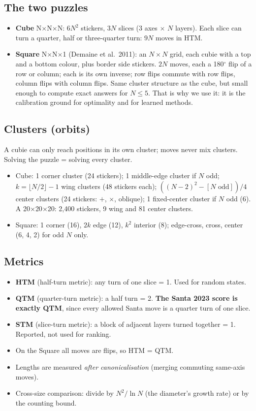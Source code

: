 \documentclass[10.5pt,a4paper]{article}
\newcommand{\Cu}[1]{#1$\times$#1$\times$#1}
\newcommand{\Sq}[1]{#1$\times$#1$\times$1}
\begin{document}
\subsection{The two puzzles}
\begin{itemize}
\item \textbf{Cube} \Cu{N}: $6N^2$ stickers, $3N$ slices (3 axes $\times$ $N$ layers). Each slice can turn a quarter, half or
three-quarter turn: $9N$ moves in HTM.
\item \textbf{Square} \Sq{N} (Demaine et al.\ 2011): an $N\times N$ grid, each cubie with a top and a bottom colour, plus
border side stickers. $2N$ moves, each a 180$^\circ$ flip of a row or column; each is its own inverse; row flips commute with
row flips, column flips with column flips. Same cluster structure as the cube, but small enough to compute exact answers for
$N\le5$. That is why we use it: it is the calibration ground for optimality and for learned methods.
\end{itemize}

\subsection{Clusters (orbits)}
A cubie can only reach positions in its own cluster; moves never mix clusters. Solving the puzzle = solving every cluster.
\begin{itemize}
\item Cube: 1 corner cluster (24 stickers); 1 middle-edge cluster if $N$ odd; $k=\lfloor N/2\rfloor-1$ wing clusters (48
stickers each); $((N-2)^2-[N\text{ odd}])/4$ center clusters (24 stickers: $+$, $\times$, oblique); 1 fixed-center cluster if
$N$ odd (6). A \Cu{20}: 2,400 stickers, 9 wing and 81 center clusters.
\item Square: 1 corner (16), $2k$ edge (12), $k^2$ interior (8); edge-cross, cross, center (6, 4, 2) for odd $N$ only.
\end{itemize}

\subsection{Metrics}
\begin{itemize}
\item \textbf{HTM} (half-turn metric): any turn of one slice = 1. Used for random states.
\item \textbf{QTM} (quarter-turn metric): a half turn = 2. \textbf{The Santa 2023 score is exactly QTM}, since every allowed
Santa move is a quarter turn of one slice.
\item \textbf{STM} (slice-turn metric): a block of adjacent layers turned together = 1. Reported, not used for ranking.
\item On the Square all moves are flips, so HTM = QTM.
\item Lengths are measured \emph{after canonicalisation} (merging commuting same-axis moves).
\item Cross-size comparison: divide by $N^2/\ln N$ (the diameter's growth rate) or by the counting bound.
\end{itemize}
\end{document}
